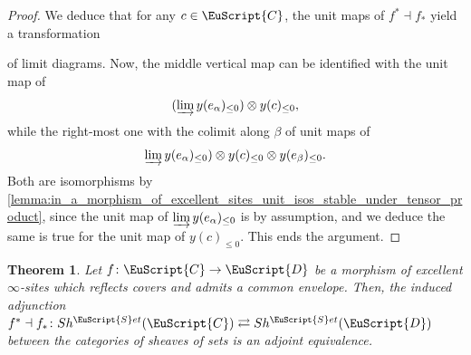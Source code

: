 \documentclass[oneside,a4paper]{amsart}
\newcommand{\euscr}[1]{\EuScript{#1}} %
\newcommand{\ccat}{\euscr{C}} %
\newcommand{\dcat}{\euscr{D}} %
\newcommand{\sets}{\euscr{S}et} %
\theoremstyle{plain}
\newtheorem{thm}{Theorem}[section]
\theoremstyle{definition}
\theoremstyle{remark}
\begin{document}
\begin{proof}
We deduce that for any $c \in \ccat$, the unit maps of $f^{*} \dashv f_{*}$ yield a transformation

\begin{center}
\end{center} 
of limit diagrams. Now, the middle vertical map can be identified with the unit map of 
\[
(\varinjlim y(e_{\alpha})_{\leq 0}) \otimes y(c) _{\leq 0},
\]
while the right-most one with the colimit along $\beta$ of unit maps of 
\[
\varinjlim y(e_{\alpha})_{\leq 0}) \otimes y(c)_{\leq 0} \otimes y(e_{\beta})_{\leq 0}.
\]
Both are isomorphisms by \cref{lemma:in_a_morphism_of_excellent_sites_unit_isos_stable_under_tensor_product}, since the unit map of $\varinjlim y(e_{\alpha})_{\leq 0}$ is by assumption, and we deduce the same is true for the unit map of $y(c)_{\leq 0}$. This ends the argument. 
\end{proof}

\begin{thm}
\label{thm:equivalence_of_categories_of_discrete_sheaves}
Let $f \colon \ccat \rightarrow \dcat$ be a morphism of excellent $\infty$-sites which reflects covers and admits a common envelope. Then, the induced adjunction $f^{*} \dashv f_{*} \colon Sh^{\sets}(\ccat) \rightleftarrows Sh^{\sets}(\dcat)$ between the categories of sheaves of sets is an adjoint equivalence.
\end{thm}
\end{document}
